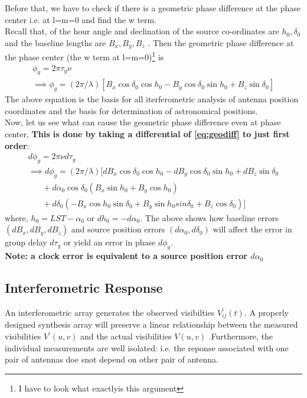 \documentclass[10pt]{report}
\newcommand{\tbf}[1]{\textbf{#1}}
\newcommand{\fn}[1]{\footnote{#1}}
\newcommand{\cc}[1]{\left({#1}\right)}
\newcommand{\rr}[1]{\left[{#1}\right]}
\begin{document}
Before that, we have to check if there is a geometric phase difference at the phase center i.e. at l=m=0 and find the w term.\\
Recall that,
of the hour angle and declination of the source co-ordinates are $h_0,\delta_0$ and the baseline lengths are $B_x,B_y ,B_z$ . Then the geometric phase difference at the phase center (the w term at l=m=0)\fn{I have to look what exactlyis this argument} is 
\begin{eqnarray*}\label{eq:geodiff}
\phi_g=2 \pi \tau_g \nu \\
\implies \phi_g=\cc{2\pi/\lambda}\rr{B_x \cos \delta_0 \cos h_0 - B_y \cos \delta_0 \sin h_0 + B_z \sin \delta_0} 
\end{eqnarray*}
The above equation is the basis for all iterferometric analysis of antenna position coordinates and the basis for determination of astronomical positions.\\
Now, let us see what can cause the geometric phase difference even at phase center, \tbf{This is done by taking a differential of \eqref{eq:geodiff} to just first order}:
\begin{eqnarray*}
d\phi_g=2 \pi \nu d \tau_g\\
\implies d\phi_g= (2\pi /\lambda)[dB_x  \cos \delta_0 \cos h_0 - dB_y  \cos \delta_0 \sin h_0 +dB_z \sin \delta_0 \\
\;\;\;\;\;\; +d\alpha_0 \cos \delta_0 \cc{B_x \sin h_0 + B_y \cos h_0} \\
\;\;\;\;\;\; +d\delta_0 \cc{-B_x \cos h_0 \sin \delta_0 + B_y \sin h_0 sin \delta_0 +B_z \cos \delta_0}]
\end{eqnarray*}
where, $h_0=LST-\alpha_0$ or $ d h_0=-d \alpha_0$. The above shows how baseline errors $(dB_x,dB_y,dB_z)$ and source position errors $(d\alpha_0 ,d\delta_0)$ will affect the error in group delay $d \tau_g$ or yield an error in phase $d \phi_g$.\\
\tbf{Note: a clock error is equivalent to a source position error $d \alpha_0$}
\subsection{Interferometric Response}

An interferometric array generates the observed visibilties $V^\prime_{ij}(t)$. A properly designed synthesis array will preserve a linear relationship between the measured visibilities $ V^\prime(u,v) $ and the actual visibilities $ V(u,v) $ .Furthermore, the individual measurements are well isolated: i.e. the reponse associated with one pair of antennas doe snot depend on other pair of antenna.\\
\end{document}
